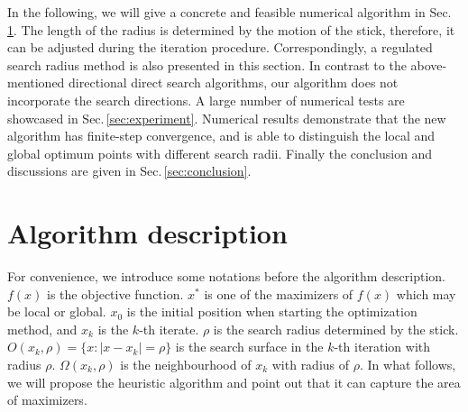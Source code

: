 \documentclass[mathpazo]{aamm}
\newcommand{\bmx}{x}
\begin{document}

In the following, we will give a concrete and
feasible numerical algorithm in Sec.\,\ref{sec:algorithm}. 
The length of the radius is determined by the motion of the
stick, therefore, it can be adjusted during the iteration procedure.
Correspondingly, a regulated search radius method is also
presented in this section.
In contrast to the above-mentioned directional direct search
algorithms, our algorithm does not incorporate the search directions. 
A large number of numerical tests are showcased in
Sec.\,\ref{sec:experiment}. Numerical results demonstrate that
the new algorithm has finite-step convergence, and is able to
distinguish the local and global optimum points with different
search radii. Finally the conclusion and discussions are given
in Sec.\,\ref{sec:conclusion}.

\section{Algorithm description}
\label{sec:algorithm}

For convenience, we introduce some notations before the algorithm
description. $f(\bmx)$ is the objective function. $\bmx^*$ is one
of the maximizers of $f(\bmx)$ which may be local or global.
$\bmx_0$ is the initial position when starting the optimization method, and
$\bmx_k$ is the $k$-th iterate.
$\rho$ is the search radius determined by the stick. $O(\bmx_k, \rho)=\{\bmx:
|\bmx-\bmx_k|=\rho\}$ is the search surface in the
$k$-th iteration with radius $\rho$. $\Omega(\bmx_k,
\rho)$ is the neighbourhood of $\bmx_k$ with radius of $\rho$.
In what follows, we will propose the heuristic algorithm and point out
that it can capture the area of maximizers. 
\end{document}
